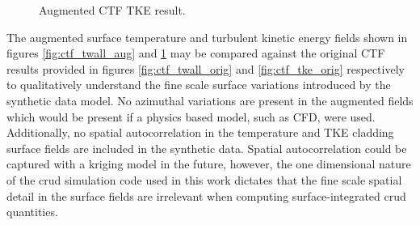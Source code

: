 \begin{figure}[H]%
    \centering
    \hspace*{-1.0em}%
    \caption[Augmented CFD TKE result.]{Augmented CTF TKE result.}%
    \label{fig:ctf_tke_aug}%
\end{figure}

The augmented surface temperature and turbulent kinetic energy fields shown in figures \ref{fig:ctf_twall_aug} and \ref{fig:ctf_tke_aug} may be compared against the original CTF results provided in figures \ref{fig:ctf_twall_orig} and \ref{fig:ctf_tke_orig} respectively to qualitatively understand the fine scale surface variations introduced by the synthetic data model.  No azimuthal variations are present in the augmented fields which would be present if a physics based model, such as CFD, were used.  Additionally, no spatial autocorrelation in the temperature and TKE cladding surface fields are included in the synthetic data.  Spatial autocorrelation could be captured with a kriging model in the future, however, the one dimensional nature of the crud simulation code used in this work dictates that the fine scale spatial detail in the surface fields are irrelevant when computing surface-integrated crud quantities.


